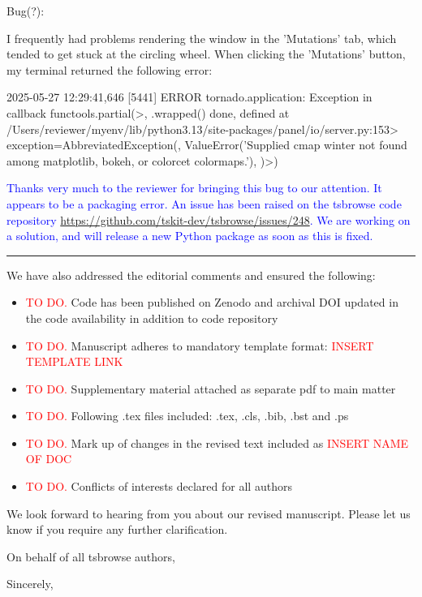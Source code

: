 \documentclass{letter}
\begin{document}
\begin{letter}{}
Bug(?):

I frequently had problems rendering the window in the 'Mutations' tab, which tended to get stuck at the 
circling wheel. When clicking the 'Mutations' button, my terminal returned the following error:

2025-05-27 12:29:41,646 [5441] ERROR    tornado.application: Exception in callback functools.partial(>, .wrapped() 
done, defined at \\
/Users/reviewer/myenv/lib/python3.13/site-packages/panel/io/server.py:153> 
exception=AbbreviatedException(, ValueError('Supplied cmap winter not found among matplotlib, bokeh, or colorcet 
colormaps.'), )>)

\textcolor{blue}{Thanks very much to the reviewer for bringing this bug to our attention. It appears to be a 
packaging error. An issue has been raised on the tsbrowse code repository 
\url{https://github.com/tskit-dev/tsbrowse/issues/248}. We are working on a solution, and will release a new 
Python package as soon as this is fixed.}\\


\hrule


We have also addressed the editorial comments and ensured the following:
\begin{itemize}
    \item \textcolor{red}{TO DO.} Code has been published on Zenodo and archival DOI updated in the code availability in addition 
        to code repository
    \item \textcolor{red}{TO DO.} Manuscript adheres to mandatory template format: \textcolor{red}{INSERT TEMPLATE LINK}
    \item \textcolor{red}{TO DO.} Supplementary material attached as separate pdf to main matter
    \item \textcolor{red}{TO DO.} Following .tex files included: .tex, .cls, .bib, .bst and .ps 
    \item \textcolor{red}{TO DO.} Mark up of changes in the revised text included as \textcolor{red}{INSERT NAME OF DOC}
    \item \textcolor{red}{TO DO.} Conflicts of interests declared for all authors
\end{itemize}

We look forward to hearing from you about our revised manuscript. Please let us know if you require any 
further clarification.

On behalf of all tsbrowse authors,
\closing{Sincerely,}

\end{letter}
\end{document}
